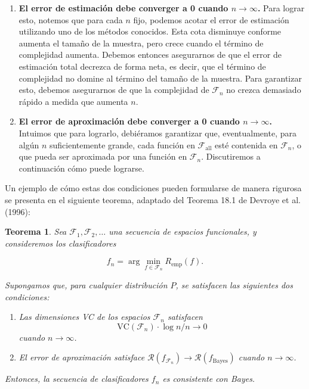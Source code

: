 \documentclass{report}
\newtheorem{thm}{Teorema}[section]
\begin{document}
\begin{enumerate}
    \item \textbf{El error de estimación debe converger a 0 cuando \(n \to \infty\).} Para lograr esto, 
    notemos que para cada \(n\) fijo, podemos acotar el error de estimación utilizando uno de los 
    métodos conocidos. Esta cota disminuye conforme aumenta el tamaño de la muestra, pero 
    crece cuando el término de complejidad aumenta. Debemos entonces asegurarnos de que el error de 
    estimación total decrezca de forma neta, es decir, que el término de complejidad no domine al término 
    del tamaño de la muestra. Para garantizar esto, debemos asegurarnos de que la complejidad de 
    \(\mathcal{F}_n\) no crezca demasiado rápido a medida que aumenta \(n\).

    \item \textbf{El error de aproximación debe converger a 0 cuando \(n \to \infty\).} Intuimos que 
    para lograrlo, 
    debiéramos garantizar que, eventualmente, para algún \(n\) suficientemente grande, cada función en 
    \(\mathcal{F}_{\text{all}}\) esté contenida en \(\mathcal{F}_n\), o que pueda ser aproximada por 
    una función en \(\mathcal{F}_n\). Discutiremos a continuación cómo puede lograrse.
\end{enumerate}


Un ejemplo de cómo estas dos condiciones pueden formularse de manera rigurosa se presenta en el 
siguiente teorema, adaptado del Teorema 18.1 de Devroye et al. (1996):\newline

\begin{thm}
 Sea \(\mathcal{F}_1, \mathcal{F}_2, \dots\) una secuencia de espacios funcionales, y 
consideremos los clasificadores 

\[
f_n = \arg\min_{f \in \mathcal{F}_n} R_{\text{emp}}(f).
\]

Supongamos que, para cualquier distribución \(P\), se satisfacen las siguientes dos condiciones:

\begin{enumerate}
    \item Las dimensiones VC de los espacios \(\mathcal{F}_n\) satisfacen 
    \[
    \text{VC}(\mathcal{F}_n) \cdot \log n / n \to 0
    \]
    cuando \(n \to \infty\).
    
    \item El error de aproximación satisface \(\mathcal{R}(f_{\mathcal{F}_n}) \to \mathcal{R}(f_{\text{Bayes}})\) 
    cuando \(n \to \infty\).
\end{enumerate}

Entonces, la secuencia de clasificadores \(f_n\) es consistente con Bayes.

\end{thm}
\vspace{0.3cm}
\end{document}
